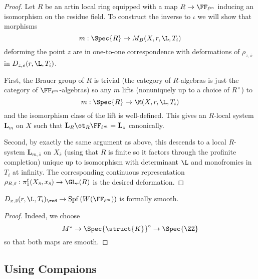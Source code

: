 \documentclass{article}
\newcommand{\LL}{\mathbf{L}}
\newcommand{\Spf}[1]{\mathrm{Spf}\left( #1 \right)}
\begin{document}
\begin{proof}
Let $R$ be an artin local ring equipped with a map $R \to \FF_{\ell^m}$ inducing an isomorphism on the residue field. To construct the inverse to $\iota$ we will show that morphisms
\[ m : \Spec{R} \to M_B(X, r, \L, T_i) \]
deforming the point $z$ are in one-to-one correspondence with deformations of $\rho_{z,\bar{s}}$ in $D_{z, \bar{s}}(r, \L, T_i)$. 
\par 
First, the Brauer group of $R$ is trivial (the category of \etale $R$-algebras is just the category of \etale $\FF_{\ell^m}$-algebras) so any $m$ lifts (nonuniquely up to a choice of $R^\times$) to
\[ m : \Spec{R} \to \M(X, r, \L, T_i) \]
and the isomorphism class of the lift is well-defined. This gives an $R$-local system $\LL_m$ on $X$ such that $\LL_{R} \ot_R \FF_{\ell^m} = \LL_z$ canonically. 
\par 
Second, by exactly the same argument as above, this descends to a local $R$-system $\LL_{m, \bar{s}}$ on $X_{\bar{s}}$ (using that $R$ is finite so it factors through the profinite completion) unique up to isomorphism with determinant $\L$ and monofromies in $T_i$ at infinity. The corresponding continuous representation $\rho_{R, \bar{s}} : \pi_1^t(X_{\bar{s}}, x_{\bar{s}}) \to \GL_r(R)$ is the desired deformation. 
\end{proof}

\begin{cor}
$D_{x, \bar{s}}(r, \L, T_i)_{\red} \to \Spf{W(\FF_{\ell^m})}$ is formally smooth.
\end{cor}

\begin{proof}
Indeed, we choose
\[ M^\circ \to \Spec{\struct{K}}^\circ \to \Spec{\ZZ} \]
so that both maps are smooth. 
\end{proof}

\subsection{Using Compaions}
\end{document}

